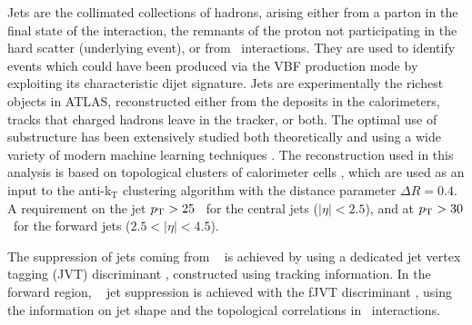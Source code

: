 Jets are the collimated collections of hadrons, arising either
from a parton in the final state of the interaction, the remnants
of the proton not participating in the hard scatter (underlying event),
or from \pileup~interactions. They are used to identify events
which could have been produced via the VBF production mode by
exploiting its characteristic dijet signature. Jets are experimentally the richest
objects in ATLAS, reconstructed either from the deposits in the
calorimeters, tracks that charged hadrons leave in the tracker,
or both. The optimal use of substructure has been extensively
studied both theoretically \cite{Altheimer:2012mn} and using
a wide variety of modern machine learning techniques \cite{Larkoski:2017jix}.
The reconstruction used in this analysis is based on topological
clusters of calorimeter cells \cite{Aad:2016upy}, which are used as
an input to the anti-k$_\text{T}$ clustering algorithm
\cite{Cacciari:2008gp, Cacciari:2011ma} with the distance parameter
$\Delta R = 0.4$. A requirement on the jet $p_{\text{T}} > 25$ \GeV~for the
central jets ($|\eta| < 2.5$), and at $p_{\text{T}} > 30$ \GeV~for the forward
jets ($2.5 < |\eta| < 4.5$).

The suppression of jets coming from \pileup~ is achieved by using a
dedicated jet vertex tagging (JVT) discriminant \cite{ATLAS-CONF-2014-018},
constructed using tracking information. In the forward region, \pileup~
jet suppression is achieved with the fJVT discriminant \cite{Aaboud:2017pou},
using the information on jet shape and the topological correlations in
\pileup~interactions.

